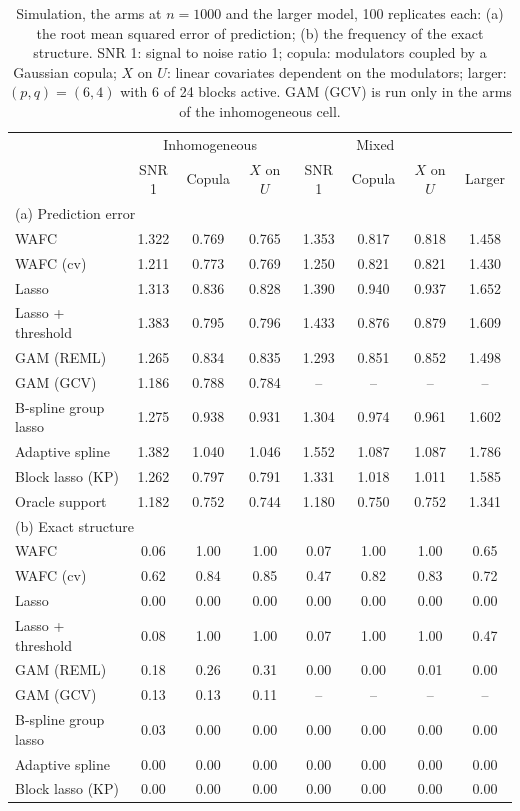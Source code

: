 \begin{table}[tp]
\color{colR1}
\caption{Simulation, the arms at $n = 1000$ and the larger model, 100 replicates each: (a) the root mean squared error of prediction; (b) the frequency of the exact structure. SNR 1: signal to noise ratio 1; copula: modulators coupled by a Gaussian copula; $X$ on $U$: linear covariates dependent on the modulators; larger: $(p,q) = (6,4)$ with 6 of 24 blocks active. GAM (GCV) is run only in the arms of the inhomogeneous cell.}
\label{tab:sim-arms}
\centering
\footnotesize
\setlength{\tabcolsep}{4pt}
\begin{tabular}{lccccccc}
\hline
 & \multicolumn{3}{c}{Inhomogeneous} & \multicolumn{3}{c}{Mixed} & \\
 & SNR 1 & Copula & $X$ on $U$ & SNR 1 & Copula & $X$ on $U$ & Larger \\
\hline
\multicolumn{8}{l}{(a) Prediction error} \\
WAFC & 1.322 & 0.769 & 0.765 & 1.353 & 0.817 & 0.818 & 1.458 \\
WAFC (cv) & 1.211 & 0.773 & 0.769 & 1.250 & 0.821 & 0.821 & 1.430 \\
Lasso & 1.313 & 0.836 & 0.828 & 1.390 & 0.940 & 0.937 & 1.652 \\
Lasso + threshold & 1.383 & 0.795 & 0.796 & 1.433 & 0.876 & 0.879 & 1.609 \\
GAM (REML) & 1.265 & 0.834 & 0.835 & 1.293 & 0.851 & 0.852 & 1.498 \\
GAM (GCV) & 1.186 & 0.788 & 0.784 & -- & -- & -- & -- \\
B-spline group lasso & 1.275 & 0.938 & 0.931 & 1.304 & 0.974 & 0.961 & 1.602 \\
Adaptive spline & 1.382 & 1.040 & 1.046 & 1.552 & 1.087 & 1.087 & 1.786 \\
Block lasso (KP) & 1.262 & 0.797 & 0.791 & 1.331 & 1.018 & 1.011 & 1.585 \\
Oracle support & 1.182 & 0.752 & 0.744 & 1.180 & 0.750 & 0.752 & 1.341 \\
\hline
\multicolumn{8}{l}{(b) Exact structure} \\
WAFC & 0.06 & 1.00 & 1.00 & 0.07 & 1.00 & 1.00 & 0.65 \\
WAFC (cv) & 0.62 & 0.84 & 0.85 & 0.47 & 0.82 & 0.83 & 0.72 \\
Lasso & 0.00 & 0.00 & 0.00 & 0.00 & 0.00 & 0.00 & 0.00 \\
Lasso + threshold & 0.08 & 1.00 & 1.00 & 0.07 & 1.00 & 1.00 & 0.47 \\
GAM (REML) & 0.18 & 0.26 & 0.31 & 0.00 & 0.00 & 0.01 & 0.00 \\
GAM (GCV) & 0.13 & 0.13 & 0.11 & -- & -- & -- & -- \\
B-spline group lasso & 0.03 & 0.00 & 0.00 & 0.00 & 0.00 & 0.00 & 0.00 \\
Adaptive spline & 0.00 & 0.00 & 0.00 & 0.00 & 0.00 & 0.00 & 0.00 \\
Block lasso (KP) & 0.00 & 0.00 & 0.00 & 0.00 & 0.00 & 0.00 & 0.00 \\
\hline
\end{tabular}
\end{table}

